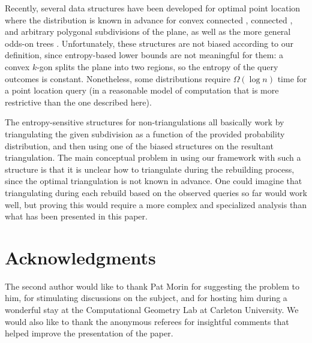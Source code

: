 \documentclass[11pt]{article}
\begin{document}
Recently,
several data structures have been developed for optimal point location where
the distribution is known in advance for convex connected
\cite{ColletteDuIaLaMo08}, connected
\cite{ColletteDuIaLaMo09}, and arbitrary polygonal
\cite{BoseDeDoDuKiMo10} subdivisions of the plane,
as well as the more general odds-on trees \cite{BoseDeDoDuKiMo10a}.
Unfortunately, these structures are not biased according to our
definition, since entropy-based lower bounds 
are not meaningful for them: a convex $k$-gon splits the
plane into two regions, so the entropy of the query outcomes is constant.
Nonetheless, some distributions require
$\Omega(\log n)$ time for a point location query (in a reasonable model
of computation that is more restrictive than the one described here).

The entropy-sensitive structures for
non-triangulations all basically work by triangulating the given subdivision as
a function of the provided probability distribution, and then using one of the
biased structures on the resultant triangulation. The main conceptual problem
in using our framework with such a structure is that it is  unclear how to
triangulate during the rebuilding process, since the optimal triangulation is
not known in advance. One could imagine that triangulating during each rebuild
based on the observed queries so far would work well, but proving this would
require a more complex and specialized analysis than what has been presented in
this paper.

\section*{Acknowledgments}

The second author would like to thank Pat Morin for suggesting the 
problem to him, for stimulating discussions on the subject,  and for 
hosting him during a wonderful stay at the Computational
Geometry Lab at Carleton University.
We would also like to thank the anonymous referees for 
insightful comments that helped improve the presentation of
the paper.
\end{document}
